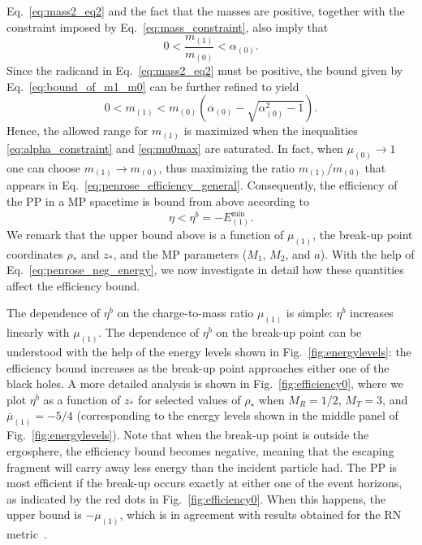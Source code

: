 Eq.~\eqref{eq:mass2_eq2} and the fact that the masses are positive, together with the constraint imposed by Eq.~\eqref{eq:mass_constraint}, also imply that
\begin{equation}\label{eq:bound_of_m1_m0}
  0 < \frac{m_{(1)}}{m_{(0)}} < \alpha_{(0)} .
\end{equation}
Since the radicand in Eq.~\eqref{eq:mass2_eq2} must be positive, the bound given by Eq.~\eqref{eq:bound_of_m1_m0} can be further refined to yield
\begin{equation} \label{eq:m1_max}
  0 < m_{(1)} < m_{(0)} \left( \alpha_{(0)} - \sqrt{\alpha_{(0)}^2 - 1} \right).
\end{equation}
Hence, the allowed range for $m_{(1)}$ is maximized when the inequalities \eqref{eq:alpha_constraint} and \eqref{eq:mu0max} are saturated. In fact, when $\mu_{(0)} \rightarrow 1$ one can choose $m_{(1)}\rightarrow m_{(0)}$, thus maximizing the ratio $m_{(1)}/m_{(0)}$ that appears in Eq.~\eqref{eq:penrose_efficiency_general}. Consequently, the efficiency of the PP in a MP spacetime is bound from above according to
\begin{equation} \label{eq:eta_max_theory}
  \eta < \eta ^{b}  = -E_{(1)}^{\mathrm {min}}.
\end{equation}
%
We remark that the upper bound above is a function of $\mu_{(1)}$, the break-up point coordinates $\rho_*$ and $z_*$, and the MP parameters ($M_1$, $M_2$, and $a$). With the help of Eq.~\eqref{eq:penrose_neg_energy}, we now investigate in detail how these quantities affect the efficiency bound.

The dependence of $\eta^{b}$ on the charge-to-mass ratio $\mu_{(1)}$ is simple: $\eta^{b}$ increases linearly with $\mu_{(1)}$. The dependence of $\eta^{b}$ on the break-up point can be understood with the help of the energy levels shown in Fig.~\ref{fig:energylevels}: the efficiency bound increases as the break-up point approaches either one of the black holes. A more detailed analysis is shown in Fig.~\ref{fig:efficiency0}, where we plot $\eta^{b}$ as a function of $z_*$ for selected values of $\rho_*$ when $M_R=1/2$, $M_T=3$, and $\overline \mu_{(1)} = -5/4$ (corresponding to the energy levels shown in the middle panel of Fig.~\ref{fig:energylevels}). Note that when the break-up point is outside the ergosphere, the efficiency bound becomes negative, meaning that the escaping fragment will carry away less energy than the incident particle had. The PP is most efficient if the break-up occurs exactly at either one of the event horizons, as indicated by the red dots in Fig.~\ref{fig:efficiency0}. When this happens, the upper bound is $-\mu_{(1)}$, which is in agreement with results obtained for the RN metric~\cite{bhat1985energetics,parthasarathy1986high}.

